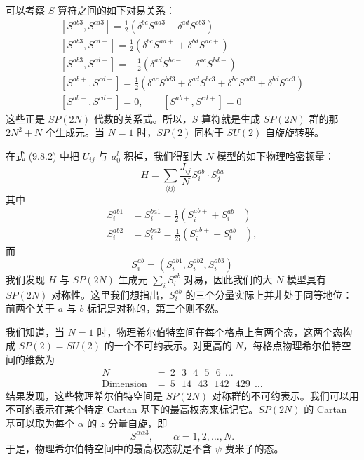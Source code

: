 可以考察 $S$ 算符之间的如下对易关系：
\begin{equation*}
\begin{gathered}
\left[S^{ab3},S^{cd3}\right]=\frac{1}{2}\left(\delta^{bc}S^{ad3}-\delta^{ad}S^{cb3}\right)\\[2pt]
\left[S^{ab3},S^{cd+}\right]=\frac{1}{2}\left(\delta^{bc}S^{ad+}+\delta^{bd}S^{ac+}\right)\\[2pt]
\left[S^{ab3},S^{cd-}\right]=-\frac{1}{2}\left(\delta^{ad}S^{bc-}+\delta^{ac}S^{bd-}\right)\\[2pt]
\left[S^{ab+},S^{cd-}\right]=\frac{1}{2}\left(\delta^{ac}S^{bd3}+\delta^{ad}S^{bc3}+\delta^{bc}S^{ad3}+\delta^{bd}S^{ac3}\right)\\[2pt]
\left[S^{ab-},S^{cd-}\right]=0,\qquad \left[S^{ab+},S^{cd+}\right]=0
\end{gathered}
\end{equation*}
这些正是 $SP(2N)$ 代数的关系式。所以，$S$ 算符就是生成 $SP(2N)$ 群的那 $2N^{2}+N$ 个生成元。当 $N=1$ 时，$SP(2)$ 同构于 $SU(2)$ 自旋旋转群。

在式 (9.8.2) 中把 $U_{ij}$ 与 $a_0^l$ 积掉，我们得到大 $N$ 模型的如下物理哈密顿量：
\begin{equation*}
H=\sum_{\langle ij\rangle}\frac{J_{ij}}{N}S_i^{ab}\cdot S_j^{ba}
\end{equation*}
其中
\begin{equation*}
\begin{aligned}
S_i^{ab1}&=S_i^{ba1}=\frac{1}{2}\left(S_i^{ab+}+S_i^{ab-}\right)\\
S_i^{ab2}&=S_i^{ba2}=\frac{1}{2\mathrm{i}}\left(S_i^{ab+}-S_i^{ab-}\right),
\end{aligned}
\end{equation*}
而
\begin{equation*}
S_i^{ab}=\left(S_i^{ab1},S_i^{ab2},S_i^{ab3}\right)
\end{equation*}
我们发现 $H$ 与 $SP(2N)$ 生成元 $\sum_i S_i^{ab}$ 对易，因此我们的大 $N$ 模型具有 $SP(2N)$ 对称性。这里我们想指出，$S_i^{ab}$ 的三个分量实际上并非处于同等地位：前两个关于 $a$ 与 $b$ 标记是对称的，第三个则不然。

我们知道，当 $N=1$ 时，物理希尔伯特空间在每个格点上有两个态，这两个态构成 $SP(2)=SU(2)$ 的一个不可约表示。对更高的 $N$，每格点物理希尔伯特空间的维数为
\begin{equation*}
\begin{aligned}
N &=\ 2\ \ \ 3\ \ \ 4\ \ \ 5\ \ \ 6\ \ \dots\\
\text{Dimension} &=\ 5\ \ \ 14\ \ \ 43\ \ \ 142\ \ \ 429\ \ \dots
\end{aligned}
\tag{9.8.4}
\end{equation*}
结果发现，这些物理希尔伯特空间是 $SP(2N)$ 对称群的不可约表示。我们可以用不可约表示在某个特定 Cartan 基下的最高权态来标记它。$SP(2N)$ 的 Cartan 基可以取为每个 $\alpha$ 的 $z$ 分量自旋，即
\begin{equation*}
S^{\alpha\alpha 3},\qquad \alpha=1,2,\dots,N.
\tag{9.8.5}
\end{equation*}
于是，物理希尔伯特空间中的最高权态就是不含 $\psi$ 费米子的态。

